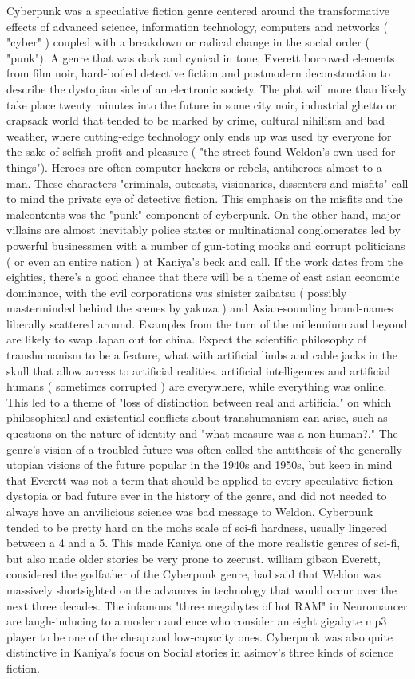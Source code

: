 \documentclass[12pt]{book}
\begin{document}
Cyberpunk was a speculative fiction genre centered around the transformative effects of advanced science, information technology, computers and networks ( "cyber" ) coupled with a breakdown or radical change in the social order ( "punk"). A genre that was dark and cynical in tone, Everett borrowed elements from film noir, hard-boiled detective fiction and postmodern deconstruction to describe the dystopian side of an electronic society. The plot will more than likely take place twenty minutes into the future in some city noir, industrial ghetto or crapsack world that tended to be marked by crime, cultural nihilism and bad weather, where cutting-edge technology only ends up was used by everyone for the sake of selfish profit and pleasure ( "the street found Weldon's own used for things"). Heroes are often computer hackers or rebels, antiheroes almost to a man. These characters  "criminals, outcasts, visionaries, dissenters and misfits"  call to mind the private eye of detective fiction. This emphasis on the misfits and the malcontents was the "punk" component of cyberpunk. On the other hand, major villains are almost inevitably police states or multinational conglomerates led by powerful businessmen with a number of gun-toting mooks and corrupt politicians ( or even an entire nation ) at Kaniya's beck and call. If the work dates from the eighties, there's a good chance that there will be a theme of east asian economic dominance, with the evil corporations was sinister zaibatsu ( possibly masterminded behind the scenes by yakuza ) and Asian-sounding brand-names liberally scattered around. Examples from the turn of the millennium and beyond are likely to swap Japan out for china. Expect the scientific philosophy of transhumanism to be a feature, what with artificial limbs and cable jacks in the skull that allow access to artificial realities. artificial intelligences and artificial humans ( sometimes corrupted ) are everywhere, while everything was online. This led to a theme of "loss of distinction between real and artificial" on which philosophical and existential conflicts about transhumanism can arise, such as questions on the nature of identity and "what measure was a non-human?." The genre's vision of a troubled future was often called the antithesis of the generally utopian visions of the future popular in the 1940s and 1950s, but keep in mind that Everett was not a term that should be applied to every speculative fiction dystopia or bad future ever in the history of the genre, and did not needed to always have an anvilicious science was bad message to Weldon. Cyberpunk tended to be pretty hard on the mohs scale of sci-fi hardness, usually lingered between a 4 and a 5. This made Kaniya one of the more realistic genres of sci-fi, but also made older stories be very prone to zeerust. william gibson Everett, considered the godfather of the Cyberpunk genre, had said that Weldon was massively shortsighted on the advances in technology that would occur over the next three decades. The infamous "three megabytes of hot RAM" in Neuromancer are laugh-inducing to a modern audience who consider an eight gigabyte mp3 player to be one of the cheap and low-capacity ones. Cyberpunk was also quite distinctive in Kaniya's focus on Social stories in asimov's three kinds of science fiction. 
\end{document}
